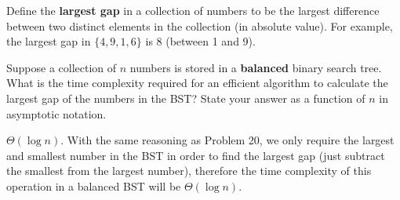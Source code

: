 \begin{prob}
    Define the \textbf{largest gap} in a collection of numbers to be the largest difference
    between two distinct elements in the collection (in absolute value).
    For example, the largest gap in $\{4, 9, 1, 6\}$ is 8 (between 1 and 9).

    Suppose a collection of $n$ numbers is stored in a \textbf{balanced} binary search
    tree.
    What is the time complexity required for an efficient algorithm to calculate
    the largest gap of the numbers in the BST? State your answer as a function of $n$ in
    asymptotic notation.

    \begin{soln}
        $\Theta(\log n)$. With the same reasoning as Problem 20, we only require the largest and 
        smallest number in the BST in order to find the largest gap (just subtract the smallest from 
        the largest number), therefore the time complexity of this operation in a balanced BST will 
        be $\Theta(\log{n})$.
    \end{soln}

\end{prob}
